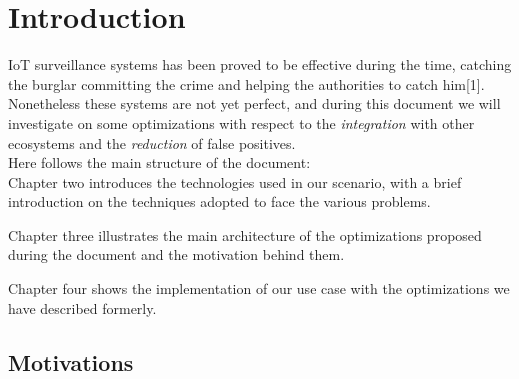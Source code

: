 \chapter{Introduction}

IoT surveillance systems has been proved to be effective during the time,
catching the burglar committing the crime and helping the authorities to
catch him[1]. Nonetheless these systems are not yet perfect, and during
this document we will investigate on some optimizations with respect to
the \textit{integration} with other ecosystems and the \textit{reduction}
of false positives.\\
Here follows the main structure of the document:\\

Chapter two introduces the technologies used in our scenario, with a brief
introduction on the techniques adopted to face the various problems.

Chapter three illustrates the main architecture of the optimizations proposed
during the document and the motivation behind them.

Chapter four shows the implementation of our use case with the optimizations
we have described formerly.


\section{Motivations}

